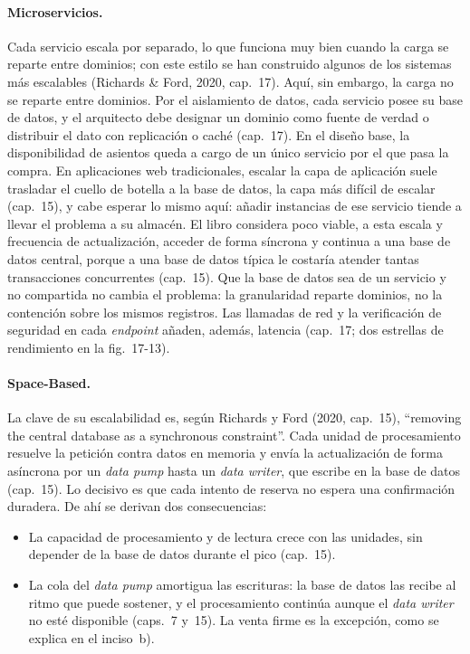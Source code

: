 \paragraph{Microservicios.}
Cada servicio escala por separado, lo que funciona muy bien cuando la carga se
reparte entre dominios; con este estilo se han construido algunos de los sistemas más
escalables (Richards \& Ford, 2020, cap.~17). Aquí, sin embargo, la carga no se
reparte entre dominios. Por el aislamiento de datos, cada servicio posee su base de
datos, y el arquitecto debe designar un dominio como fuente de verdad o distribuir el
dato con replicación o caché (cap.~17). En el diseño base, la disponibilidad de
asientos queda a cargo de un único servicio por el que pasa la compra. En aplicaciones
web tradicionales, escalar la capa de aplicación suele trasladar el cuello de botella
a la base de datos, la capa más difícil de escalar (cap.~15), y cabe esperar lo mismo
aquí: añadir instancias de ese servicio tiende a llevar el problema a su almacén. El
libro considera poco viable, a esta escala y frecuencia de actualización, acceder de
forma síncrona y continua a una base de datos central, porque a una base de datos
típica le costaría atender tantas transacciones concurrentes (cap.~15). Que la base
de datos sea de un servicio y no compartida no cambia el problema: la granularidad
reparte dominios, no la contención sobre los mismos registros. Las llamadas de red y
la verificación de seguridad en cada \emph{endpoint} añaden, además, latencia
(cap.~17; dos estrellas de rendimiento en la fig.~17-13).

\paragraph{Space-Based.}
La clave de su escalabilidad es, según Richards y Ford (2020, cap.~15), ``removing
the central database as a synchronous \mbox{constraint}''. Cada unidad de
procesamiento resuelve la petición contra datos en memoria y envía la actualización
de forma asíncrona por un \emph{data pump} hasta un \emph{data writer}, que escribe
en la base de datos (cap.~15). Lo decisivo es que cada intento de reserva no espera una
confirmación duradera. De ahí se derivan dos consecuencias:

\begin{itemize}
  \item La capacidad de procesamiento y de lectura crece con las unidades, sin
    depender de la base de datos durante el pico (cap.~15).
  \item La cola del \emph{data pump} amortigua las escrituras: la base de datos las
    recibe al ritmo que puede sostener, y el procesamiento continúa aunque el
    \emph{data writer} no esté disponible (caps.~7 y~15). La venta firme es la excepción, como se
    explica en el inciso~b).
\end{itemize}

